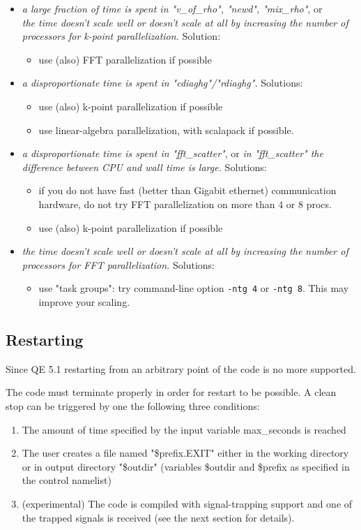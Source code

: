 \documentclass[12pt,a4paper]{article}
\begin{document}
\begin{itemize}
\item 
{\em  a large fraction of time is spent in "v\_of\_rho", "newd", "mix\_rho"}, or\\
{\em  the time doesn't scale well or doesn't scale at all by increasing the 
  number of processors for k-point parallelization.}  Solution:
\begin{itemize}
\item 
  use (also) FFT parallelization if possible
\end{itemize}
\item
{\em  a disproportionate time is spent in "cdiaghg"/"rdiaghg".} Solutions:
\begin{itemize}
\item 
   use (also) k-point parallelization if possible
\item 
   use linear-algebra parallelization, with scalapack if possible.
\end{itemize}
\item
{\em a disproportionate time is spent in "fft\_scatter"}, or
{\em in "fft\_scatter" the difference between CPU and wall time is large.} Solutions:
\begin{itemize}
\item 
    if you do not have fast (better than Gigabit ethernet) communication
    hardware, do not try FFT parallelization on more than 4 or 8 procs.
\item 
    use (also) k-point parallelization if possible
\end{itemize}
\item
{\em  the time doesn't scale well or doesn't scale at all by increasing the 
  number of processors for FFT parallelization.}
    Solutions:
\begin{itemize}
\item 
    use "task groups": try command-line option \texttt{-ntg 4} or
    \texttt{-ntg 8}. This may improve your scaling.
\end{itemize}
\end{itemize}

\subsection{Restarting}

Since QE 5.1 restarting from an arbitrary point of the code is no more supported.

The code must terminate properly in order for restart to be possible. A clean stop can be triggered by one the following three conditions:
\begin{enumerate}
\item The amount of time specified by the input variable max\_seconds is reached
\item The user creates a file named "\$prefix.EXIT" either in the working
directory or in output directory "\$outdir" 
(variables \$outdir and \$prefix as specified in the control namelist)
\item (experimental) The code is compiled with signal-trapping support and one of the trapped signals is received (see the next section for details).
\end{enumerate}
\end{document}
